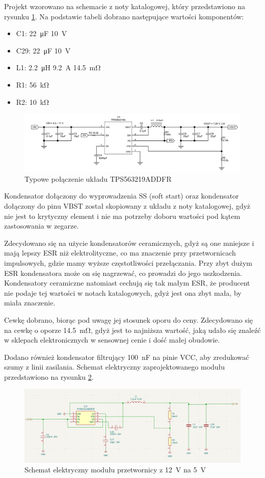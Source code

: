 \documentclass[../../main.tex]{subfiles}
\begin{document}
Projekt wzorowano na schemacie z noty katalogowej, który przedstawiono na rysunku \ref{fig:buck}.
Na podstawie tabeli dobrano następujące wartości komponentów:
\begin{itemize}
    \item C1: \SI{22}{\micro\farad} \SI{10}{\volt}
    \item C29: \SI{22}{\micro\farad} \SI{10}{\volt}
    \item L1: \SI{2.2}{\micro\henry} \SI{9.2}{\ampere} \SI{14.5}{\milli\ohm}
    \item R1: \SI{56}{\kilo\ohm}
    \item R2: \SI{10}{\kilo\ohm}
\end{itemize}

\begin{figure}[H]
    \centering
    \includegraphics[width=1\textwidth]{buck.png}
    \caption{Typowe połączenie układu TPS563219ADDFR \cite{st:buck}}
    \label{fig:buck}
\end{figure}

Kondensator dołączony do wyprowadzenia SS (soft start) oraz kondensator dołączony do pinu VBST został skopiowany z układu z noty katalogowej, gdyż nie jest to krytyczny element i nie ma potrzeby doboru wartości pod 
kątem zastosowania w zegarze.

Zdecydowano się na użycie kondensatorów ceramicznych, gdyż są one mniejsze i mają lepszy ESR niż elektrolityczne, co ma znaczenie przy przetwornicach impulsowych,
gdzie mamy wyższe częstotliwości przełączania. Przy zbyt dużym ESR kondensatora może on się nagrzewać, co prowadzi do jego uszkodzenia.
Kondensatory ceramiczne natomiast cechują się tak małym ESR, że producent nie podaje tej wartości w notach katalogowych, gdyż jest ona zbyt mała, by miała znaczenie.

Cewkę dobrano, biorąc pod uwagę jej stosunek oporu do ceny. Zdecydowano się na cewkę o oporze \SI{14.5}{\milli\ohm}, 
gdyż jest to najniższa wartość, jaką udało się znaleźć w sklepach elektronicznych w sensownej cenie i dość małej obudowie.

Dodano również kondensator filtrujący \SI{100}{\nano\farad} na pinie VCC, aby zredukować szumy z linii zasilania.
Schemat elektryczny zaprojektowanego modułu przedstawiono na rysunku \ref{fig:buck-schemat}.

\begin{figure}[H]
    \centering
    \includegraphics[width=1\textwidth]{5vTo12V_ schemat.png}
    \caption{Schemat elektryczny modułu przetwornicy z \SI{12}{\volt} na \SI{5}{\volt}}
    \label{fig:buck-schemat}
\end{figure}
\end{document}
